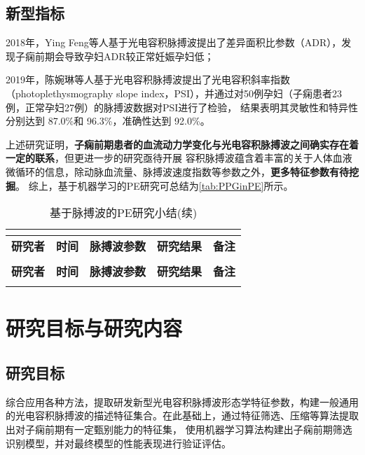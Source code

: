 \subsection{新型指标}
2018年，Ying Feng等人\cite{Feng2018}基于光电容积脉搏波提出了差异面积比参数（ADR），发现子痫前期会导致孕妇ADR较正常妊娠孕妇低；

2019年，陈婉琳等人\cite{Chen2019}基于光电容积脉搏波提出了光电容积斜率指数（photoplethysmography slope index，PSI），并通过对50例孕妇（子痫患者23例，正常孕妇27例）的脉搏波数据对PSI进行了检验，
结果表明其灵敏性和特异性分别达到 87.0\%和 96.3\%，准确性达到 92.0\%。

上述研究证明，\textbf{子痫前期患者的血流动力学变化与光电容积脉搏波之间确实存在着一定的联系}，但更进一步的研究亟待开展
容积脉搏波蕴含着丰富的关于人体血液微循环的信息，除动脉血流量、脉搏波速度指数等参数之外，\textbf{更多特征参数有待挖掘}。
综上，基于机器学习的PE研究可总结为\autoref{tab:PPGinPE}所示。

\begin{center}
    \fontsize{10}{4}
	\begin{longtable}{p{3cm}<{\centering}p{1cm}<{\centering}p{2cm}<{\centering}p{6cm}<{\centering}p{1cm}<{\centering}}
		\caption{基于脉搏波的PE研究小结}\\
		\label{tab:PPGinPE}\\
		\hline
            \textbf{研究者}&\textbf{时间}&\textbf{脉搏波参数}&\textbf{研究结果}&\textbf{备注}\\
        \hline
        \endfirsthead
        \caption{基于脉搏波的PE研究小结(续)}\\
        \hline
            \textbf{研究者}&\textbf{时间}&\textbf{脉搏波参数}&\textbf{研究结果}&\textbf{备注}\\
        \hline
        \endhead 
        \hline
        \endfoot
	\end{longtable}
\end{center}

\section{研究目标与研究内容}

\subsection{研究目标}
综合应用各种方法，提取研发新型光电容积脉搏波形态学特征参数，构建一般通用的光电容积脉搏波的描述特征集合。在此基础上，通过特征筛选、压缩等算法提取出对子痫前期有一定甄别能力的特征集，
使用机器学习算法构建出子痫前期筛选识别模型，并对最终模型的性能表现进行验证评估。
